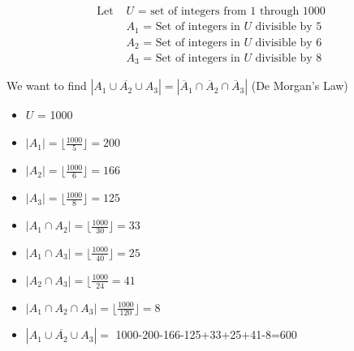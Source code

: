 \documentclass[12pt]{article}
\begin{document}
\begin{align*}
    \text{Let } &\text{$U$ = set of integers from 1 through 1000}\\
    &\text{$A_1$ = Set of integers in $U$ divisible by 5}\\
    &\text{$A_2$ = Set of integers in $U$ divisible by 6}\\
    &\text{$A_3$ = Set of integers in $U$ divisible by 8}
\end{align*}

We want to find $|\overline{A_1\cup A_2\cup A_3}| = |\overline{A}_1\cap\overline{A}_2\cap \overline{A}_3|$ (De Morgan's Law)\\

\begin{itemize}
    \item $U$ = 1000
    \item $|A_1|=\lfloor \frac{1000}{5}\rfloor =200$
    \item $|A_2| = \lfloor \frac{1000}{6}\rfloor = 166$
    \item $|A_3|=\lfloor \frac{1000}{8}\rfloor = 125$
    \item $|A_1\cap A_2| = \lfloor\frac{1000}{30}\rfloor = 33$
    \item $|A_1\cap A_3| = \lfloor\frac{1000}{40}\rfloor = 25$
    \item $|A_2\cap A_3| = \lfloor\frac{1000}{24} = 41$
    \item $|A_1\cap A_2 \cap A_3| = \lfloor \frac{1000}{120}\rfloor = 8$
    \item $|\overline{A_1 \cup A_2\cup A_3}| =$ 1000-200-166-125+33+25+41-8=600
\end{itemize}
\end{document}
